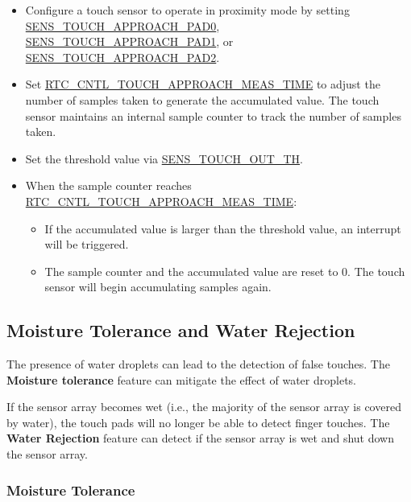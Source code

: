 \documentclass[main\_\_EN.tex]{subfiles}
\begin{document}
\begin{itemize}
    \item Configure a touch sensor to operate in proximity mode by setting \hyperref[fielddesc:SENSTOUCHAPPROACHPAD0]{SENS\_TOUCH\_APPROACH\_PAD0}, \hyperref[fielddesc:SENSTOUCHAPPROACHPAD1]{SENS\_TOUCH\_APPROACH\_PAD1}, or \hyperref[fielddesc:SENSTOUCHAPPROACHPAD2]{SENS\_TOUCH\_APPROACH\_PAD2}.
    \item Set \hyperref[fielddesc:RTCCNTLTOUCHAPPROACHMEASTIME]{RTC\_CNTL\_TOUCH\_APPROACH\_MEAS\_TIME} to adjust the number of samples taken to generate the accumulated value. The touch sensor maintains an internal sample counter to track the number of samples taken.
    \item Set the threshold value via \hyperref[fielddesc:SENSTOUCHOUTTH1]{SENS\_TOUCH\_OUT\_TH}.
    \item When the sample counter reaches \hyperref[fielddesc:RTCCNTLTOUCHAPPROACHMEASTIME]{RTC\_CNTL\_TOUCH\_APPROACH\_MEAS\_TIME}:
    \begin{itemize}
        \item If the accumulated value is larger than the threshold value, an interrupt will be triggered.
        \item The sample counter and the accumulated value are reset to 0. The touch sensor will begin accumulating samples again.
    \end{itemize}
\end{itemize}

\subsection{Moisture Tolerance and Water Rejection}

The presence of water droplets can lead to the detection of false touches. The \textbf{Moisture tolerance} feature can mitigate the effect of water droplets. 

If the sensor array becomes wet (i.e., the majority of the sensor array is covered by water), the touch pads will no longer be able to detect finger touches. The \textbf{Water Rejection} feature can detect if the sensor array is wet and shut down the sensor array. 


\subsubsection{Moisture Tolerance}
\end{document}
